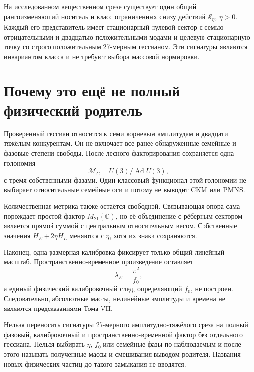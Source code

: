\begin{theorem}
На исследованном вещественном срезе существует один общий
рангоизменяющий носитель и класс ограниченных снизу действий
$\mathcal S_\eta$, $\eta>0$. Каждый его представитель имеет стационарный
нулевой сектор с семью отрицательными и двадцатью положительными модами и
целевую стационарную точку со строго положительным 27-мерным гессианом.
Эти сигнатуры являются инвариантом класса и не требуют выбора массовой
нормировки.
\end{theorem}

\section{Почему это ещё не полный физический родитель}

Проверенный гессиан относится к семи корневым амплитудам и двадцати
тяжёлым конкурентам. Он не включает все ранее обнаруженные семейные и
фазовые степени свободы. После лесного факторирования сохраняется одна
голономия
\begin{equation}
 \mathcal M_C=U(3)/\operatorname{Ad}U(3),
 \label{eq:v7-freeze-phase-moduli}
\end{equation}
с тремя собственными фазами. Один классовый функционал этой голономии не
выбирает относительные семейные оси и потому не выводит CKM или PMNS.

Количественная метрика также остаётся свободной. Связывающая опора сама
порождает простой фактор $M_{21}(\mathbb C)$, но её объединение с рёберным
сектором является прямой суммой с центральным относительным весом.
Собственные значения $H_E+2\eta H_L$ меняются с $\eta$, хотя их знаки
сохраняются.

Наконец, одна размерная калибровка фиксирует только общий линейный масштаб.
Пространственно-временное произведение оставляет
\begin{equation}
 \lambda_E=\frac{\pi^2}{f_0},
 \label{eq:v7-freeze-f0-boundary}
\end{equation}
а единый физический калибровочный след, определяющий $f_0$, не построен.
Следовательно, абсолютные массы, нелинейные амплитуды и времена не являются
предсказаниями Тома VII.

\begin{nogocriterion}
Нельзя переносить сигнатуры 27-мерного амплитудно-тяжёлого среза на полный
фазовый, калибровочный и пространственно-временной фактор без отдельного
гессиана. Нельзя выбирать $\eta$, $f_0$ или семейные фазы по наблюдаемым и
после этого называть полученные массы и смешивания выводом родителя.
Названия новых физических частиц до такого замыкания не вводятся.
\end{nogocriterion}

